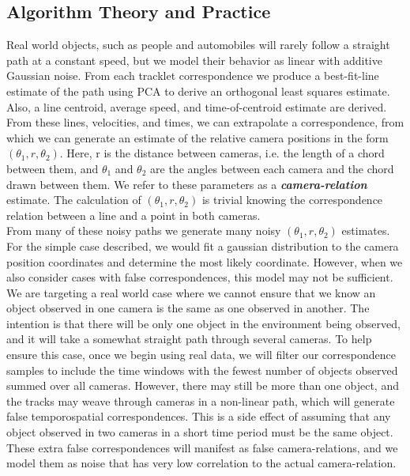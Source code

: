 \documentclass[journal]{IEEEtran}
\begin{document}
	\subsection{Algorithm Theory and Practice}
		\indent Real world objects, such as people and automobiles will rarely follow a straight path at a constant speed, but we model their behavior as linear with additive Gaussian noise. From each tracklet correspondence we produce a best-fit-line estimate of the path using PCA to derive an orthogonal least squares estimate. Also, a line centroid, average speed, and time-of-centroid estimate are derived. From these lines, velocities, and times, we can extrapolate a correspondence, from which we can generate an estimate of the relative camera positions in the form $(\theta_1, r, \theta_2)$. Here, r is the distance between cameras, i.e. the length of a chord between them, and $\theta_1$ and $\theta_2$ are the angles between each camera and the chord drawn between them. We refer to these parameters as a \textbf{\textit{camera-relation}} estimate. The calculation of  $(\theta_1,r,\theta_2)$ is trivial knowing the correspondence relation between a line and a point in both cameras. \\
		\indent From many of these noisy paths we generate many noisy $(\theta_1,r,\theta_2)$ estimates. For the simple case described, we would fit a gaussian distribution to the camera position coordinates and determine the most likely coordinate. However, when we also consider cases with false correspondences, this model may not be sufficient. \\
		\indent We are targeting a real world case where we cannot ensure that we know an object observed in one camera is the same as one observed in another. The intention is that there will be only one object in the environment being observed, and it will take a somewhat straight path through several cameras. To help ensure this case, once we begin using real data, we will filter our correspondence samples to include the time windows with the fewest number of objects observed summed over all cameras. However, there may still be more than one object, and the tracks may weave through cameras in a non-linear path, which will generate false temporospatial correspondences. This is a side effect of assuming that any object observed in two cameras in a short time period must be the same object. These extra false correspondences will manifest as false camera-relations, and we model them as noise that has very low correlation to the actual camera-relation. \\
\end{document}
